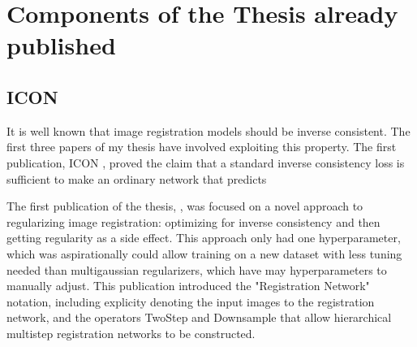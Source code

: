 \documentclass{article}
\begin{document}
\section{Components of the Thesis already published}

\subsection{ICON}
%

It is well known that image registration models should be inverse consistent. The first three papers of my thesis have involved exploiting this property. The first publication, ICON \cite{greer2021icon}, proved the claim that a standard inverse consistency loss is sufficient to make an ordinary network that predicts

The first publication of the thesis, \cite{greer2021icon}, was focused on a novel approach to regularizing image registration: optimizing for inverse consistency and then getting regularity as a side effect. This approach only had one hyperparameter, which was aspirationally could allow training on a new dataset with less tuning needed than multigaussian regularizers, which have may hyperparameters to manually adjust. This publication introduced the "Registration Network" notation, including explicity denoting the input images to the registration network, and the operators TwoStep and Downsample that allow hierarchical multistep registration networks to be constructed.
\end{document}
